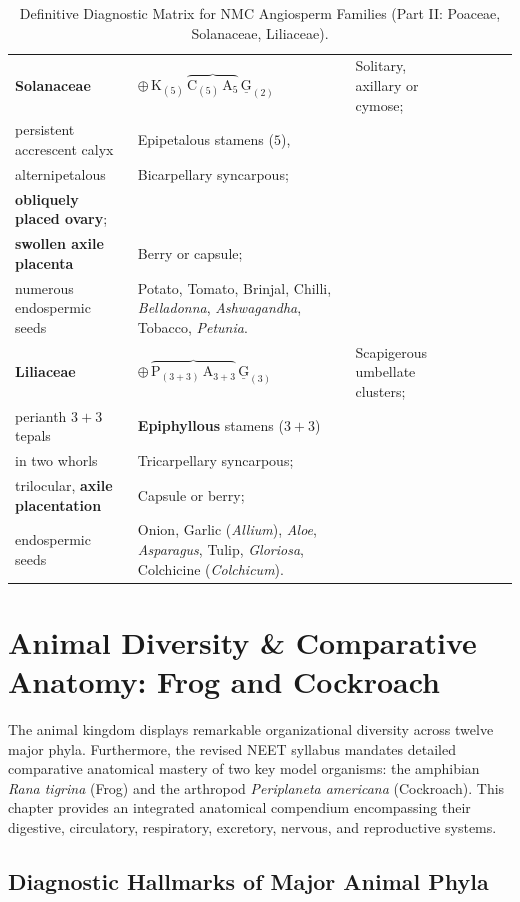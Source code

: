 \documentclass[10pt,twoside,openright]{book}
\begin{document}
\begin{landscape}
\begin{table}[p]
\begin{tabularx}{\linewidth}{@{}l >{\RaggedRight}p{3.8cm} >{\RaggedRight}p{2.0cm} >{\RaggedRight}p{2.0cm} >{\RaggedRight}p{2.0cm} >{\RaggedRight}p{1.8cm} >{\RaggedRight}X@{}}
\textbf{Solanaceae} & $\oplus\,\text{K}_{(5)}\,\overbrace{\text{C}_{(5)}\,\text{A}_5}\,\underline{\text{G}}_{(2)}$ & Solitary, axillary or cymose;\\persistent accrescent calyx & Epipetalous stamens ($5$),\\alternipetalous & Bicarpellary syncarpous;\\\textbf{obliquely placed ovary};\\\textbf{swollen axile placenta} & Berry or capsule;\\numerous endospermic seeds & Potato, Tomato, Brinjal, Chilli, \textit{Belladonna}, \textit{Ashwagandha}, Tobacco, \textit{Petunia}. \\
\textbf{Liliaceae} & $\oplus\,\overbrace{\text{P}_{(3+3)}\,\text{A}_{3+3}}\,\underline{\text{G}}_{(3)}$ & Scapigerous umbellate clusters;\\perianth $3+3$ tepals & \textbf{Epiphyllous} stamens ($3+3$)\\in two whorls & Tricarpellary syncarpous;\\trilocular, \textbf{axile placentation} & Capsule or berry;\\endospermic seeds & Onion, Garlic (\textit{Allium}), \textit{Aloe}, \textit{Asparagus}, Tulip, \textit{Gloriosa}, Colchicine (\textit{Colchicum}). \\
\bottomrule
\end{tabularx}
\caption{Definitive Diagnostic Matrix for NMC Angiosperm Families (Part II: Poaceae, Solanaceae, Liliaceae).}
\label{tab:plant_families_landscape_2}
\end{table}
\end{landscape}

\chapter{Animal Diversity \& Comparative Anatomy: Frog and Cockroach}

The animal kingdom displays remarkable organizational diversity across twelve major phyla. Furthermore, the revised NEET syllabus mandates detailed comparative anatomical mastery of two key model organisms: the amphibian \textit{Rana tigrina} (Frog) and the arthropod \textit{Periplaneta americana} (Cockroach). This chapter provides an integrated anatomical compendium encompassing their digestive, circulatory, respiratory, excretory, nervous, and reproductive systems.

\section{Diagnostic Hallmarks of Major Animal Phyla}
\end{document}
